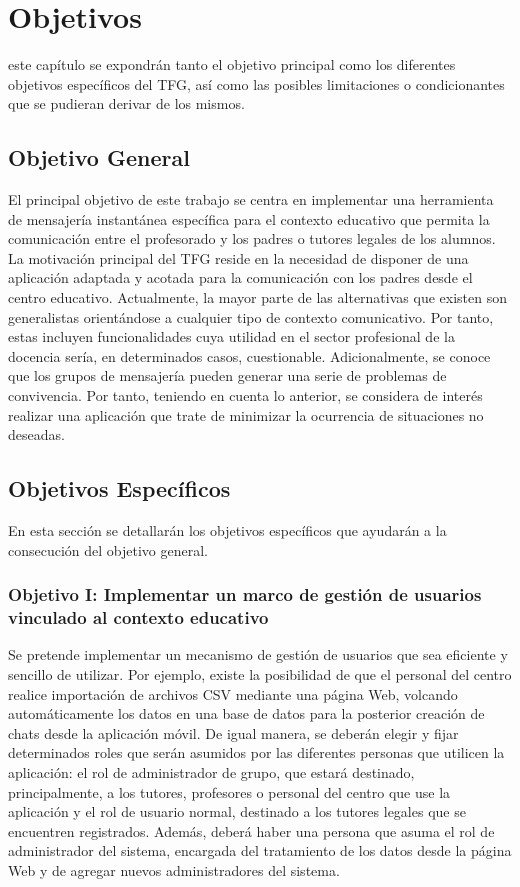 \chapter{Objetivos}
\label{chap:objetivos}

\noindent

 este capítulo se expondrán tanto el objetivo principal como los diferentes objetivos específicos del \acs{TFG}, así como las posibles limitaciones o condicionantes que se pudieran derivar de los mismos.

\section{Objetivo General}
El principal objetivo de este trabajo se centra en implementar una herramienta de mensajería instantánea específica para el contexto educativo que permita la comunicación entre el profesorado y los padres o tutores legales de los alumnos. La motivación principal del \acs{TFG} reside en la necesidad de disponer de una aplicación adaptada y acotada para la comunicación con los padres desde el centro educativo. Actualmente, la mayor parte de las alternativas que existen son generalistas orientándose a cualquier tipo de contexto comunicativo. Por tanto, estas incluyen funcionalidades cuya utilidad en el sector profesional de la docencia sería, en determinados casos, cuestionable. Adicionalmente, se conoce que los grupos de mensajería pueden generar una serie de problemas de convivencia. Por tanto, teniendo en cuenta lo anterior, se considera de interés realizar una aplicación que trate de minimizar la ocurrencia de situaciones no deseadas.

\section{Objetivos Específicos}
En esta sección se detallarán los objetivos específicos que ayudarán a la consecución del objetivo general.

\clearpage

\subsection{Objetivo I: Implementar un marco de gestión de usuarios vinculado al contexto educativo}
Se pretende implementar un mecanismo de gestión de usuarios que sea eficiente y sencillo de utilizar. Por ejemplo, existe la posibilidad de que el personal del centro realice importación de archivos \acs{CSV} mediante una página Web, volcando automáticamente los datos en una base de datos para la posterior creación de chats desde la aplicación móvil. De igual manera, se deberán elegir y fijar determinados roles que serán asumidos por las diferentes personas que utilicen la aplicación: el rol de administrador de grupo, que estará destinado, principalmente, a los tutores, profesores o personal del centro que use la aplicación y  el rol de usuario normal, destinado a los tutores legales que se encuentren registrados. Además, deberá haber una persona que asuma el rol de administrador del sistema, encargada del tratamiento de los datos desde la página Web y de agregar nuevos administradores del sistema.

